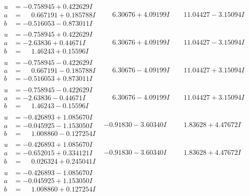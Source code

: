 \documentclass[1p]{elsarticle_modified}
\theoremstyle{definition}
\begin{document}
$$\begin{array}{c|c|c}
\begin{aligned}
u &= -0.758945 + 0.422629 I \\
a &= \phantom{-}0.667191 + 0.185788 I \\
b &= -0.516053 - 0.873011 I\end{aligned}
 & \phantom{-}6.30676 + 4.09199 I & \phantom{-}11.04427 - 3.15094 I \\ \hline\begin{aligned}
u &= -0.758945 + 0.422629 I \\
a &= -2.63836 + 0.44671 I \\
b &= \phantom{-}1.46243 + 0.15596 I\end{aligned}
 & \phantom{-}6.30676 + 4.09199 I & \phantom{-}11.04427 - 3.15094 I \\ \hline\begin{aligned}
u &= -0.758945 - 0.422629 I \\
a &= \phantom{-}0.667191 - 0.185788 I \\
b &= -0.516053 + 0.873011 I\end{aligned}
 & \phantom{-}6.30676 - 4.09199 I & \phantom{-}11.04427 + 3.15094 I \\ \hline\begin{aligned}
u &= -0.758945 - 0.422629 I \\
a &= -2.63836 - 0.44671 I \\
b &= \phantom{-}1.46243 - 0.15596 I\end{aligned}
 & \phantom{-}6.30676 - 4.09199 I & \phantom{-}11.04427 + 3.15094 I \\ \hline\begin{aligned}
u &= -0.426893 + 1.085670 I \\
a &= -0.045925 - 1.153050 I \\
b &= \phantom{-}1.008860 - 0.127254 I\end{aligned}
 & -0.91830 - 3.60340 I & \phantom{-}1.83628 + 4.47672 I \\ \hline\begin{aligned}
u &= -0.426893 + 1.085670 I \\
a &= -0.652015 + 0.334121 I \\
b &= \phantom{-}0.026324 + 0.245041 I\end{aligned}
 & -0.91830 - 3.60340 I & \phantom{-}1.83628 + 4.47672 I \\ \hline\begin{aligned}
u &= -0.426893 - 1.085670 I \\
a &= -0.045925 + 1.153050 I \\
b &= \phantom{-}1.008860 + 0.127254 I\end{aligned}

\end{array}$$
\end{document}
